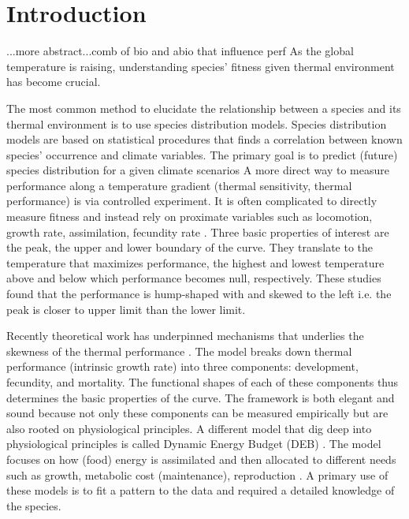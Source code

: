 \section*{Introduction}
...more abstract...comb of bio and abio that influence perf
As the global temperature is raising, understanding species' fitness given thermal environment has become crucial.

The most common method to elucidate the relationship between a species and its thermal environment is to use species distribution models. 
Species distribution models are based on  statistical procedures that finds a correlation between known species' occurrence and climate variables.
The primary goal is to predict (future) species distribution for a given climate scenarios \citep{Guisan2005, Austin2007, Elith2009}
A more direct way to measure performance along a temperature gradient (thermal sensitivity, thermal performance) is via controlled experiment.
It is often complicated to directly measure fitness and instead rely on proximate variables such as locomotion, growth rate, assimilation, fecundity rate \citep[][and reference therein]{Angilletta2009}.
Three basic properties of interest are the peak, the upper and lower boundary of the curve.
They translate to the temperature that maximizes performance, the highest and lowest temperature above and below which performance becomes null, respectively. 
These studies found that the performance is hump-shaped with and skewed to the left i.e. the peak is closer to upper limit than the lower limit.

Recently theoretical work has underpinned mechanisms that underlies the skewness of the thermal performance \citep{Amarasekare2012}.
The model  breaks down thermal performance (intrinsic growth rate)  into three components: development, fecundity, and mortality.
The functional shapes of each of these components thus determines the basic properties of the curve.
The framework is both elegant and sound because not only these components can be measured empirically but are also rooted on physiological principles.
A different model that dig deep into physiological principles is called Dynamic Energy Budget (DEB) \citep{Kooijman2009}.
The model focuses on how (food) energy is assimilated and then allocated to different needs such as growth, metabolic cost (maintenance), reproduction \citep{Kooijman2009}.
A primary use of  these models is to fit a pattern to the data and required a detailed knowledge of the species.  


